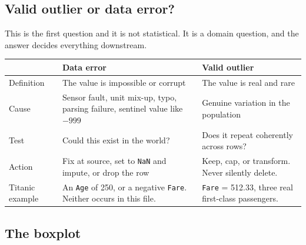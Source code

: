 \documentclass[11pt,a4paper]{article}
\begin{document}
\subsection{Valid outlier or data error?}

This is the first question and it is not statistical. It is a domain question, and the
answer decides everything downstream.

\begin{tabularx}{\textwidth}{@{}l X X@{}}
\toprule
\rowcolor{tablehead} & \textbf{Data error} & \textbf{Valid outlier} \\
\midrule
Definition & The value is impossible or corrupt & The value is real and rare \\
Cause & Sensor fault, unit mix-up, typo, parsing failure, sentinel value like $-999$ & Genuine variation in the population \\
Test & Could this exist in the world? & Does it repeat coherently across rows? \\
Action & Fix at source, set to \lstinline|NaN| and impute, or drop the row & Keep, cap, or transform. Never silently delete. \\
Titanic example & An \texttt{Age} of 250, or a negative \texttt{Fare}. Neither occurs in this file. & \texttt{Fare} = 512.33, three real first-class passengers. \\
\bottomrule
\end{tabularx}




\subsection{The boxplot}
\end{document}
